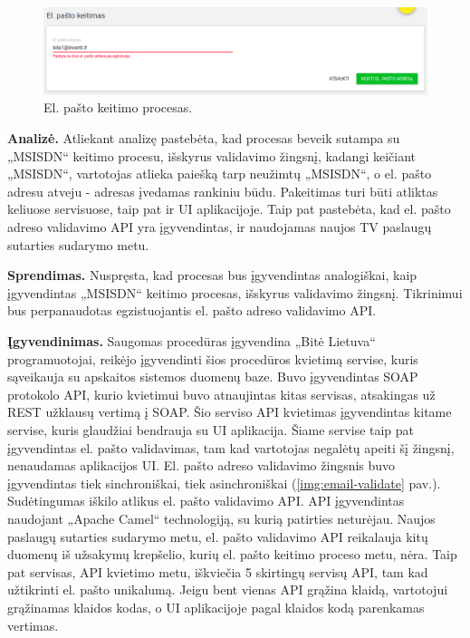 \begin{figure}[H]
    \centering
    \includegraphics[scale=0.3]{img/email-change.png}
    \caption{El. pašto keitimo procesas.}
    \label{img:email-change}
\end{figure}

\textbf{Analizė.}
Atliekant analizę pastebėta, kad procesas beveik sutampa su „MSISDN“ keitimo procesu, išskyrus validavimo žingsnį, kadangi keičiant „MSISDN“,
vartotojas atlieka paiešką tarp neužimtų „MSISDN“, o el. pašto adresu atveju - adresas įvedamas rankiniu būdu. Pakeitimas turi būti atliktas keliuose servisuose,
taip pat ir UI aplikacijoje. Taip pat pastebėta, kad el. pašto adreso validavimo API yra įgyvendintas, ir naudojamas naujos TV paslaugų sutarties sudarymo metu.

\textbf{Sprendimas.}
Nuspręsta, kad procesas bus įgyvendintas analogiškai, kaip įgyvendintas „MSISDN“ keitimo procesas, išskyrus validavimo žingsnį. Tikrinimui bus perpanaudotas
egzistuojantis el. pašto adreso validavimo API.

\textbf{Įgyvendinimas.}
Saugomas procedūras įgyvendina „Bitė Lietuva“ programuotojai, reikėjo įgyvendinti šios procedūros kvietimą servise, kuris sąveikauja su apskaitos sistemos duomenų baze.
Buvo įgyvendintas SOAP protokolo API, kurio kvietimui buvo atnaujintas kitas servisas, atsakingas už REST užklausų vertimą į SOAP. Šio serviso API kvietimas įgyvendintas
kitame servise, kuris glaudžiai bendrauja su UI aplikacija. Šiame servise taip pat įgyvendintas el. pašto validavimas, tam kad vartotojas negalėtų apeiti šį žingsnį,
nenaudamas aplikacijos UI. El. pašto adreso validavimo žingsnis buvo įgyvendintas tiek sinchroniškai, tiek asinchroniškai (\ref{img:email-validate} pav.).
Sudėtingumas iškilo atlikus el. pašto validavimo API. API įgyvendintas naudojant „Apache Camel“ technologiją, su kurią patirties neturėjau.
Naujos paslaugų sutarties sudarymo metu, el. pašto validavimo API reikalauja kitų duomenų iš užsakymų krepšelio, kurių el. pašto keitimo proceso metu, nėra.
Taip pat servisas, API kvietimo metu, iškviečia 5 skirtingų servisų API, tam kad užtikrinti el. pašto unikalumą. Jeigu bent vienas API grąžina klaidą, vartotojui grąžinamas
klaidos kodas, o UI aplikacijoje pagal klaidos kodą parenkamas vertimas.

